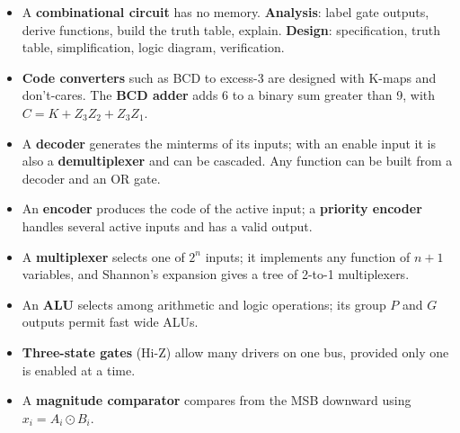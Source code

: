 

\begin{chaptersummary}
\begin{itemize}
  \item A \textbf{combinational circuit} has no memory. \textbf{Analysis}: label gate outputs, derive functions, build the truth table, explain. \textbf{Design}: specification, truth table, simplification, logic diagram, verification.
  \item \textbf{Code converters} such as BCD to excess-3 are designed with K-maps and don't-cares. The \textbf{BCD adder} adds 6 to a binary sum greater than 9, with $C=K+Z_3Z_2+Z_3Z_1$.
  \item A \textbf{decoder} generates the minterms of its inputs; with an enable input it is also a \textbf{demultiplexer} and can be cascaded. Any function can be built from a decoder and an OR gate.
  \item An \textbf{encoder} produces the code of the active input; a \textbf{priority encoder} handles several active inputs and has a valid output.
  \item A \textbf{multiplexer} selects one of $2^n$ inputs; it implements any function of $n+1$ variables, and Shannon's expansion gives a tree of 2-to-1 multiplexers.
  \item An \textbf{ALU} selects among arithmetic and logic operations; its group $P$ and $G$ outputs permit fast wide ALUs.
  \item \textbf{Three-state gates} (Hi-Z) allow many drivers on one bus, provided only one is enabled at a time.
  \item A \textbf{magnitude comparator} compares from the MSB downward using $x_i=A_i\odot B_i$.
\end{itemize}
\end{chaptersummary}

